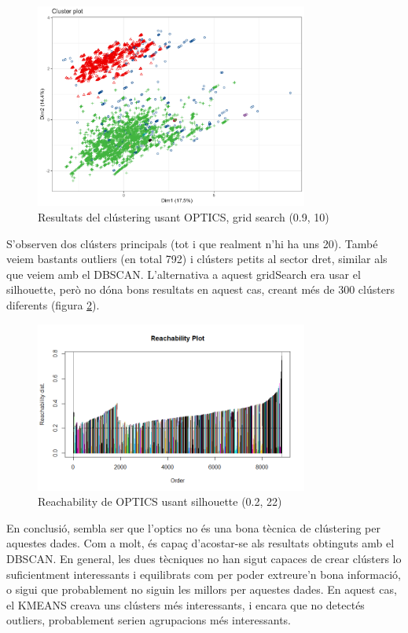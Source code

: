 \begin{figure}[H]
    \centering
    \includegraphics[width=0.8\textwidth]{Images/4_clustering/optics/opticsgrid.png}
    \caption{Resultats del clústering usant OPTICS, grid search (0.9, 10)}
    \label{fig:OPTICS_grid_res}
\end{figure}


S'observen dos clústers principals (tot i que realment n'hi ha uns 20). També veiem bastants outliers (en total 792) i clústers petits al sector dret, similar als que veiem amb el DBSCAN. L'alternativa a aquest gridSearch era usar el silhouette, però no dóna bons resultats en aquest cas, creant més de 300 clústers diferents (figura \ref{fig:OPTICS_silo}).
\begin{figure}[H]
    \centering
    \includegraphics[width=0.8\textwidth]{Images/4_clustering/optics/siloreachability.png}
    \caption{Reachability de OPTICS usant silhouette (0.2, 22)}
    \label{fig:OPTICS_silo}
\end{figure}

En conclusió, sembla ser que l'optics no és una bona tècnica de clústering per aquestes dades. Com a molt, és capaç d'acostar-se als resultats obtinguts amb el DBSCAN. En general, les dues tècniques no han sigut capaces de crear clústers lo suficientment interessants i equilibrats com per poder extreure'n bona informació, o sigui que probablement no siguin les millors per aquestes dades. En aquest cas, el KMEANS creava uns clústers més interessants, i encara que no detectés outliers, probablement serien agrupacions més interessants.


